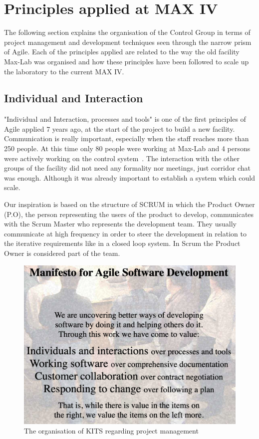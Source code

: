 \documentclass[a4paper,
              ]{jacow}
\begin{document}
\section{Principles applied at MAX IV}
The following section explains the organisation of the Control Group in terms of project management and development techniques seen through the narrow prism of Agile. Each of the principles applied are related to the way the old facility Max-Lab was organised and how these principles have been followed to scale up the laboratory to the current MAX IV.

\subsection{Individual and Interaction}
"Individual and Interaction, processes and tools" is one of the first principles of Agile applied 7 years ago, at the start of the project to build a new facility. Communication is really important, especially when the staff reaches more than 250 people. At this time only 80 people were working at Max-Lab and 4 persons were actively working on the control system~\cite{julio-maxiv-status}. The interaction with the other groups of the facility did not need any formality nor meetings, just corridor chat was enough. Although it was already important to establish a system which could scale. 

Our inspiration is based on the structure of SCRUM in which the Product Owner (P.O), the person representing the users of the product to develop, communicates with the Scrum Master who represents the development team. They usually communicate at high frequency in order to steer the development in relation to the iterative requirements like in a closed loop system. In Scrum the Product Owner is considered part of the team.

\begin{figure}[!tbh]
    \centering
    \includegraphics*[scale=0.3]{WEMPL008f1}

    \caption{The organisation of KITS regarding project management}
    \label{WEMPL008f1}
\end{figure}
\end{document}
